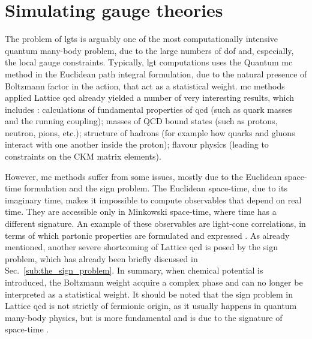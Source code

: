 \section{Simulating gauge theories}
\label{sec:simulating_gauge_theories}


The problem of \ac{lgt}s is arguably one of the most computationally intensive quantum many-body problem, due to the large numbers of \ac{dof} and, especially, the local gauge constraints.
Typically, \ac{lgt} computations uses the Quantum \ac{mc} method in the Euclidean path integral formulation, due to the natural presence of Boltzmann factor in the action, that act as a statistical weight.
\Ac{mc} methods applied Lattice \ac{qcd} already yielded a number of very interesting results, which includes \cite{lin2018qcd, banuls2020lgtreview}:
calculations of fundamental properties of \ac{qcd} (such as quark masses and the running coupling); masses of QCD bound states (such as protons, neutron, pions, etc.); structure of hadrons (for example how quarks and gluons interact with one another inside the proton); flavour physics (leading to constraints on the CKM matrix elements).

However, \ac{mc} methods suffer from some issues, mostly due to the Euclidean space-time formulation and the sign problem.
The Euclidean space-time, due to its imaginary time, makes it impossible to compute observables that depend on real time.
They are accessible only in Minkowski space-time, where time has a different signature.
An example of these observables are light-cone correlations, in terms of which partonic properties are formulated and expressed \cite{cichy2019lightcone}.
As already mentioned, another severe shortcoming of Lattice \ac{qcd} is posed by the sign problem, which has already been briefly discussed in Sec.~\ref{sub:the_sign_problem}.
In summary, when chemical potential is introduced, the Boltzmann weight acquire a complex phase and can no longer be interpreted as a statistical weight.
It should be noted that the sign problem in Lattice \ac{qcd} is not strictly of fermionic origin, as it usually happens in quantum many-body physics, but is more fundamental and is due to the signature of space-time \cite{banuls2020lgtreview}.

